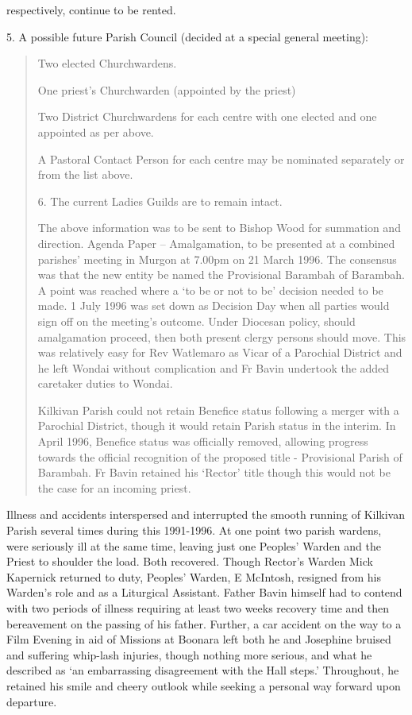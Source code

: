 respectively, continue to be rented.

5. A possible future Parish Council (decided at a special general meeting):

\begin{quote}
Two elected Churchwardens.

One priest's Churchwarden (appointed by the priest)

Two District Churchwardens for each centre with one elected and one appointed as per above.

A Pastoral Contact Person for each centre may be nominated separately or from the list above.

6. The current Ladies Guilds are to remain intact.

The above information was to be sent to Bishop Wood for summation and direction. Agenda Paper -- Amalgamation, to be presented at a combined parishes' meeting in Murgon at 7.00pm on 21 March 1996. The consensus was that the new entity be named the Provisional Barambah of Barambah. A point was reached where a `to be or not to be' decision needed to be made. 1 July 1996 was set down as Decision Day when all parties would sign off on the meeting's outcome. Under Diocesan policy, should amalgamation proceed, then both present clergy persons should move. This was relatively easy for Rev Watlemaro as Vicar of a Parochial District and he left Wondai without complication and Fr Bavin undertook the added caretaker duties to Wondai.

Kilkivan Parish could not retain Benefice status following a merger with a Parochial District, though it would retain Parish status in the interim. In April 1996, Benefice status was officially removed, allowing progress towards the official recognition of the proposed title - Provisional Parish of Barambah. Fr Bavin retained his `Rector' title though this would not be the case for an incoming priest.
\end{quote}

Illness and accidents interspersed and interrupted the smooth running of Kilkivan Parish several times during this 1991-1996. At one point two parish wardens, were seriously ill at the same time, leaving just one Peoples' Warden and the Priest to shoulder the load. Both recovered. Though Rector's Warden Mick Kapernick returned to duty, Peoples' Warden, E McIntosh, resigned from his Warden's role and as a Liturgical Assistant. Father Bavin himself had to contend with two periods of illness requiring at least two weeks recovery time and then bereavement on the passing of his father. Further, a car accident on the way to a Film Evening in aid of Missions at Boonara left both he and Josephine bruised and suffering whip-lash injuries, though nothing more serious, and what he described as `an embarrassing disagreement with the Hall steps.' Throughout, he retained his smile and cheery outlook while seeking a personal way forward upon departure.

